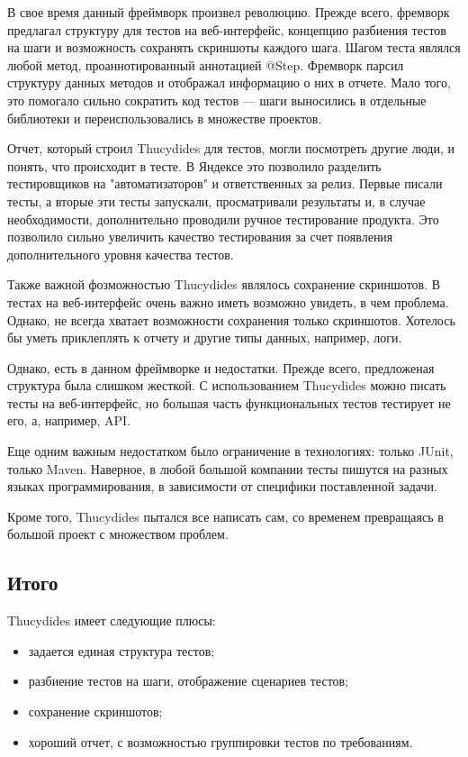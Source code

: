 В свое время данный фреймворк произвел революцию. Прежде всего, фремворк предлагал структуру для тестов на веб-интерфейс, концепцию разбиения тестов на шаги и возможность сохранять скриншоты каждого шага. Шагом теста являлся любой метод, проаннотированный аннотацией @Step.
Фремворк парсил структуру данных методов и отображал информацию о них в отчете. Мало того, это помогало сильно сократить код тестов --- шаги выносились в отдельные библиотеки и переиспользовались в множестве проектов.

Отчет, который строил Thucydides для тестов, могли посмотреть другие люди, и понять, что происходит в тесте. В Яндексе это позволило разделить тестировщиков на "автоматизаторов" и ответственных за релиз. Первые писали тесты, а вторые эти тесты запускали, просматривали результаты и, в случае необходимости, дополнительно проводили ручное тестирование продукта. Это позволило сильно увеличить качество тестирования за счет появления дополнительного уровня качества тестов.

Также важной фозможностью Thucydides являлось сохранение скриншотов. В тестах на веб-интерфейс очень важно иметь возможно увидеть, в чем проблема. Однако, не всегда хватает возможности сохранения только скриншотов. Хотелось бы уметь приклеплять к отчету и другие типы данных, например, логи.

Однако, есть в данном фреймворке и недостатки. Прежде всего, предложеная структура была слишком жесткой. С использованием Thucydides можно писать тесты на веб-интерфейс, но большая часть функциональных тестов тестирует не его, а, например, API. 

Еще одним важным недостатком было ограничение в технологиях: только JUnit, только Maven. Наверное, в любой большой компании тесты пишутся на разных языках программирования, в зависимости от специфики поставленной задачи. 

Кроме того, Thucydides пытался все написать сам, со временем превращаясь в большой проект с множеством проблем.

\subsection{Итого} 

Thucydides имеет следующие плюсы: 
\begin{itemize}
\item задается единая структура тестов;
\item разбиение тестов на шаги, отображение сценариев тестов;
\item сохранение скриншотов;
\item хороший отчет, с возможностью группировки тестов по требованиям.
\end{itemize}

